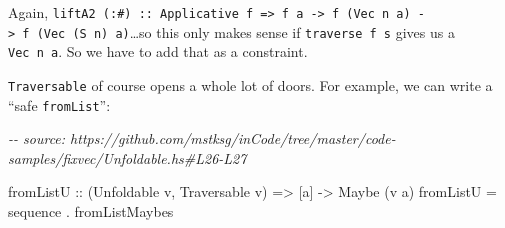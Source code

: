 \documentclass[]{article}
\newenvironment{Shaded}{}{}
\newcommand{\CommentTok}[1]{\textcolor[rgb]{0.38,0.63,0.69}{\textit{#1}}}
\newcommand{\DataTypeTok}[1]{\textcolor[rgb]{0.56,0.13,0.00}{#1}}
\newcommand{\DecValTok}[1]{\textcolor[rgb]{0.25,0.63,0.44}{#1}}
\newcommand{\FunctionTok}[1]{\textcolor[rgb]{0.02,0.16,0.49}{#1}}
\newcommand{\NormalTok}[1]{#1}
\newcommand{\OperatorTok}[1]{\textcolor[rgb]{0.40,0.40,0.40}{#1}}
\newcommand{\OtherTok}[1]{\textcolor[rgb]{0.00,0.44,0.13}{#1}}
\newcommand{\StringTok}[1]{\textcolor[rgb]{0.25,0.44,0.63}{#1}}
\begin{document}
Again,
\texttt{liftA2\ (:\#)\ ::\ Applicative\ f\ =\textgreater{}\ f\ a\ -\textgreater{}\ f\ (Vec\ n\ a)\ -\textgreater{}\ f\ (Vec\ (S\ n)\ a)}\ldots so
this only makes sense if \texttt{traverse\ f\ s} gives us a \texttt{Vec\ n\ a}.
So we have to add that as a constraint.

\begin{Shaded}
\end{Shaded}

\texttt{Traversable} of course opens a whole lot of doors. For example, we can
write a ``safe \texttt{fromList}'':

\begin{Shaded}
\begin{Highlighting}[]
\CommentTok{{-}{-} source: https://github.com/mstksg/inCode/tree/master/code{-}samples/fixvec/Unfoldable.hs\#L26{-}L27}

\OtherTok{fromListU ::}\NormalTok{ (}\DataTypeTok{Unfoldable}\NormalTok{ v, }\DataTypeTok{Traversable}\NormalTok{ v) }\OtherTok{=\textgreater{}}\NormalTok{ [a] }\OtherTok{{-}\textgreater{}} \DataTypeTok{Maybe}\NormalTok{ (v a)}
\NormalTok{fromListU }\OtherTok{=} \FunctionTok{sequence} \OperatorTok{.}\NormalTok{ fromListMaybes}
\end{Highlighting}
\end{Shaded}
\end{document}
